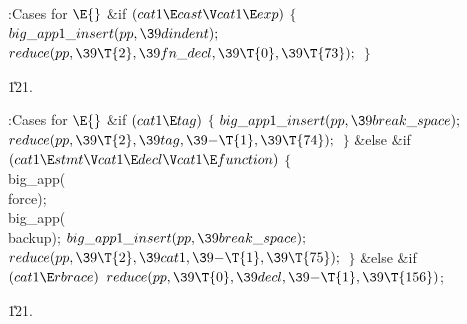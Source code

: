 \B{}:Cases for \X${}\E{}$\6
\&{if} ${}(\\{cat1}\E\\{cast}\V\\{cat1}\E\\{exp}){}$\5
${}\{{}$\1\6
${}\\{big\_app1\_insert}(\\{pp},\39\\{dindent});{}$\6
${}\\{reduce}(\\{pp},\39\T{2},\39\\{fn\_decl},\39\T{0},\39\T{73});{}$\6
\4${}\}{}$\2\par
\U121.\fi

\B{}:Cases for \X${}\E{}$\6
\&{if} ${}(\\{cat1}\E\\{tag}){}$\5
${}\{{}$\1\6
${}\\{big\_app1\_insert}(\\{pp},\39\\{break\_space});{}$\6
${}\\{reduce}(\\{pp},\39\T{2},\39\\{tag},\39{-}\T{1},\39\T{74});{}$\6
\4${}\}{}$\2\6
\&{else} \&{if} ${}(\\{cat1}\E\\{stmt}\V\\{cat1}\E\\{decl}\V\\{cat1}\E%
\\{function}){}$\5
${}\{{}$\1\6
\\{big\_app}(\\{force});\6
\\{big\_app}(\\{backup});\6
${}\\{big\_app1\_insert}(\\{pp},\39\\{break\_space});{}$\6
${}\\{reduce}(\\{pp},\39\T{2},\39\\{cat1},\39{-}\T{1},\39\T{75});{}$\6
\4${}\}{}$\2\6
\&{else} \&{if} ${}(\\{cat1}\E\\{rbrace}){}$\1\5
${}\\{reduce}(\\{pp},\39\T{0},\39\\{decl},\39{-}\T{1},\39\T{156}){}$;\2\par
\U121.\fi

